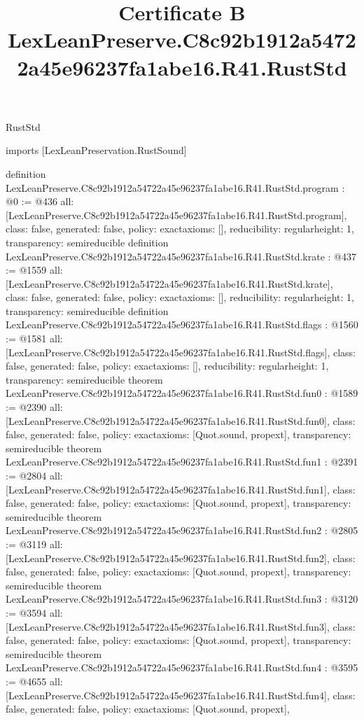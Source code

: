 \begin{lexlean}{RustStd}
\title{Certificate B LexLeanPreserve.C8c92b1912a54722a45e96237fa1abe16.R41.RustStd}
\begin{coremodule}
imports [LexLeanPreservation.RustSound]

definition LexLeanPreserve.C8c92b1912a54722a45e96237fa1abe16.R41.RustStd.program : @0 := @436 {
  all: [LexLeanPreserve.C8c92b1912a54722a45e96237fa1abe16.R41.RustStd.program],
  class: false,
  generated: false,
  policy: exact{axioms: []},
  reducibility: regular{height: 1},
  transparency: semireducible
}
definition LexLeanPreserve.C8c92b1912a54722a45e96237fa1abe16.R41.RustStd.krate : @437 := @1559 {
  all: [LexLeanPreserve.C8c92b1912a54722a45e96237fa1abe16.R41.RustStd.krate],
  class: false,
  generated: false,
  policy: exact{axioms: []},
  reducibility: regular{height: 1},
  transparency: semireducible
}
definition LexLeanPreserve.C8c92b1912a54722a45e96237fa1abe16.R41.RustStd.flags : @1560 := @1581 {
  all: [LexLeanPreserve.C8c92b1912a54722a45e96237fa1abe16.R41.RustStd.flags],
  class: false,
  generated: false,
  policy: exact{axioms: []},
  reducibility: regular{height: 1},
  transparency: semireducible
}
theorem LexLeanPreserve.C8c92b1912a54722a45e96237fa1abe16.R41.RustStd.fun0 : @1589 := @2390 {
  all: [LexLeanPreserve.C8c92b1912a54722a45e96237fa1abe16.R41.RustStd.fun0],
  class: false,
  generated: false,
  policy: exact{axioms: [Quot.sound, propext]},
  transparency: semireducible
}
theorem LexLeanPreserve.C8c92b1912a54722a45e96237fa1abe16.R41.RustStd.fun1 : @2391 := @2804 {
  all: [LexLeanPreserve.C8c92b1912a54722a45e96237fa1abe16.R41.RustStd.fun1],
  class: false,
  generated: false,
  policy: exact{axioms: [Quot.sound, propext]},
  transparency: semireducible
}
theorem LexLeanPreserve.C8c92b1912a54722a45e96237fa1abe16.R41.RustStd.fun2 : @2805 := @3119 {
  all: [LexLeanPreserve.C8c92b1912a54722a45e96237fa1abe16.R41.RustStd.fun2],
  class: false,
  generated: false,
  policy: exact{axioms: [Quot.sound, propext]},
  transparency: semireducible
}
theorem LexLeanPreserve.C8c92b1912a54722a45e96237fa1abe16.R41.RustStd.fun3 : @3120 := @3594 {
  all: [LexLeanPreserve.C8c92b1912a54722a45e96237fa1abe16.R41.RustStd.fun3],
  class: false,
  generated: false,
  policy: exact{axioms: [Quot.sound, propext]},
  transparency: semireducible
}
theorem LexLeanPreserve.C8c92b1912a54722a45e96237fa1abe16.R41.RustStd.fun4 : @3595 := @4655 {
  all: [LexLeanPreserve.C8c92b1912a54722a45e96237fa1abe16.R41.RustStd.fun4],
  class: false,
  generated: false,
  policy: exact{axioms: [Quot.sound, propext]},
}
\end{coremodule}
\end{lexlean}
